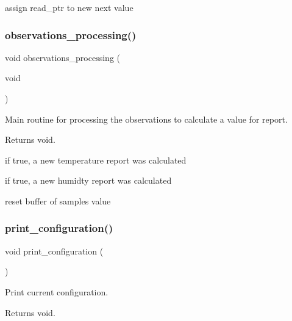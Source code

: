 assign read\+\_\+ptr to new next value \mbox{\label{i2c-th_8h_a8b67eda853f3e8cca0c729267b492861}} 
\subsubsection{\texorpdfstring{observations\+\_\+processing()}{observations\_processing()}}
{\footnotesize\ttfamily void observations\+\_\+processing (\begin{DoxyParamCaption}\item[{void}]{ }\end{DoxyParamCaption})}



Main routine for processing the observations to calculate a value for report. 

\begin{DoxyReturn}{Returns}
void. 
\end{DoxyReturn}
if true, a new temperature report was calculated

if true, a new humidty report was calculated

reset buffer of samples value \mbox{\label{i2c-th_8h_ab08b9047f47849f399950705e769be2e}} 
\subsubsection{\texorpdfstring{print\+\_\+configuration()}{print\_configuration()}}
{\footnotesize\ttfamily void print\+\_\+configuration (\begin{DoxyParamCaption}{ }\end{DoxyParamCaption})}



Print current configuration. 

\begin{DoxyReturn}{Returns}
void. 
\end{DoxyReturn}
\mbox{\label{i2c-th_8h_a49fdbb850fac1a3832e7852a24c31c72}} 
